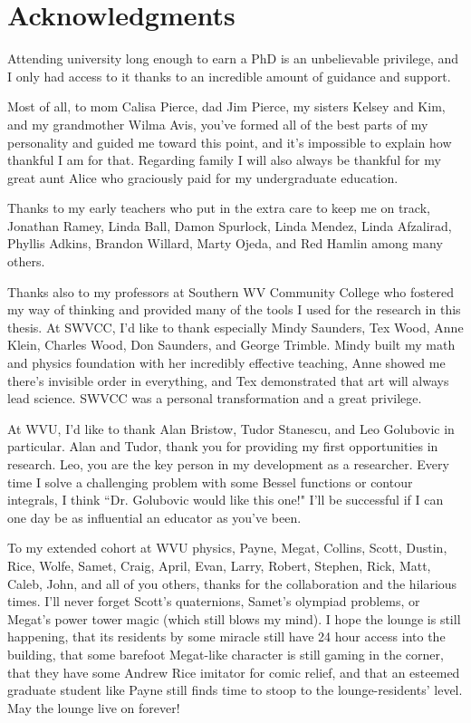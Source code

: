 
\chapter{Acknowledgments}

Attending university long enough to earn a PhD is an unbelievable privilege, and I only had access to it thanks to an incredible amount of guidance and support.

Most of all, to mom Calisa Pierce, dad Jim Pierce, my sisters Kelsey and Kim, and my grandmother Wilma Avis, you've formed all of the best parts of my personality and guided me toward this point, and it's impossible to explain how thankful I am for that. Regarding family I will also always be thankful for my great aunt Alice who graciously paid for my undergraduate education.

Thanks to my early teachers who put in the extra care to keep me on track, Jonathan Ramey, Linda Ball, Damon Spurlock, Linda Mendez, Linda Afzalirad, Phyllis Adkins, Brandon Willard, Marty Ojeda, and Red Hamlin among many others.
	
Thanks also to my professors at Southern WV Community College who fostered my way of thinking and provided many of the tools I used for the research in this thesis.
At SWVCC, I'd like to thank especially Mindy Saunders, Tex Wood, Anne Klein, Charles Wood, Don Saunders, and George Trimble. Mindy built my math and physics foundation with her incredibly effective teaching, Anne showed me there's invisible order in everything, and Tex demonstrated that art will always lead science. SWVCC was a personal transformation and a great privilege. 

At WVU, I'd like to thank Alan Bristow, Tudor Stanescu, and Leo Golubovic in particular. Alan and Tudor, thank you for providing my first opportunities in research. Leo, you are the key person in my development as a researcher. Every time I solve a challenging problem with some Bessel functions or contour integrals, I think ``Dr. Golubovic would like this one!" I'll be successful if I can one day be as influential an educator as you've been.

To my extended cohort at WVU physics, Payne, Megat, Collins, Scott, Dustin, Rice, Wolfe, Samet, Craig, April, Evan, Larry, Robert, Stephen, Rick, Matt, Caleb, John, and all of you others, thanks for the collaboration and the hilarious times. I'll never forget Scott's quaternions, Samet's olympiad problems, or Megat's power tower magic (which still blows my mind). I hope the lounge is still happening, that its residents by some miracle still have 24 hour access into the building, that some barefoot Megat-like character is still gaming in the corner, that they have some Andrew Rice imitator for comic relief, and that an esteemed graduate student like Payne still finds time to stoop to the lounge-residents' level. May the lounge live on forever!

